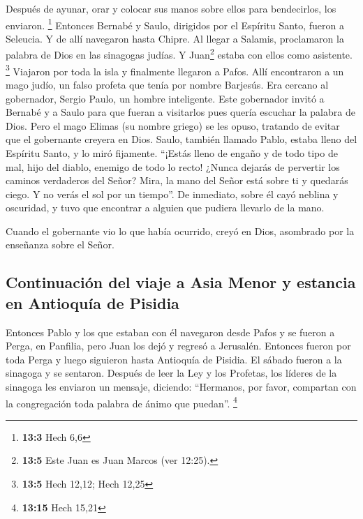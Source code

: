  Después de ayunar, orar y colocar sus manos sobre ellos
para bendecirlos, los enviaron. \footnote{\textbf{13:3} Hech 6,6}
 Entonces Bernabé y Saulo, dirigidos por el Espíritu
Santo, fueron a Seleucia. Y de allí navegaron hasta Chipre.
 Al llegar a Salamis, proclamaron la palabra de Dios en
las sinagogas judías. Y Juan\footnote{\textbf{13:5} Este Juan es Juan
  Marcos (ver 12:25).} estaba con ellos como asistente. \footnote{\textbf{13:5}
  Hech 12,12; Hech 12,25}  Viajaron por toda la isla y
finalmente llegaron a Pafos. Allí encontraron a un mago judío, un falso
profeta que tenía por nombre Barjesús.  Era cercano al
gobernador, Sergio Paulo, un hombre inteligente. Este gobernador invitó
a Bernabé y a Saulo para que fueran a visitarlos pues quería escuchar la
palabra de Dios.  Pero el mago Elimas (su nombre griego)
se les opuso, tratando de evitar que el gobernante creyera en Dios.
 Saulo, también llamado Pablo, estaba lleno del Espíritu
Santo, y lo miró fijamente.  ``¡Estás lleno de engaño y
de todo tipo de mal, hijo del diablo, enemigo de todo lo recto! ¿Nunca
dejarás de pervertir los caminos verdaderos del Señor? 
Mira, la mano del Señor está sobre ti y quedarás ciego. Y no verás el
sol por un tiempo''. De inmediato, sobre él cayó neblina y oscuridad, y
tuvo que encontrar a alguien que pudiera llevarlo de la mano.

 Cuando el gobernante vio lo que había ocurrido, creyó en
Dios, asombrado por la enseñanza sobre el Señor.

\hypertarget{continuaciuxf3n-del-viaje-a-asia-menor-y-estancia-en-antioquuxeda-de-pisidia}{%
\subsection{Continuación del viaje a Asia Menor y estancia en Antioquía
de
Pisidia}\label{continuaciuxf3n-del-viaje-a-asia-menor-y-estancia-en-antioquuxeda-de-pisidia}}

 Entonces Pablo y los que estaban con él navegaron desde
Pafos y se fueron a Perga, en Panfilia, pero Juan los dejó y regresó a
Jerusalén.  Entonces fueron por toda Perga y luego
siguieron hasta Antioquía de Pisidia. El sábado fueron a la sinagoga y
se sentaron.  Después de leer la Ley y los Profetas, los
líderes de la sinagoga les enviaron un mensaje, diciendo: ``Hermanos,
por favor, compartan con la congregación toda palabra de ánimo que
puedan''. \footnote{\textbf{13:15} Hech 15,21}

